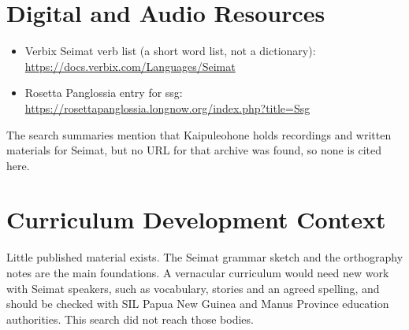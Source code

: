 \documentclass[12pt]{article}
\begin{document}
\section{Digital and Audio Resources}
\begin{itemize}
\item Verbix Seimat verb list (a short word list, not a dictionary): \url{https://docs.verbix.com/Languages/Seimat}
\item Rosetta Panglossia entry for ssg: \url{https://rosettapanglossia.longnow.org/index.php?title=Ssg}
\end{itemize}
The search summaries mention that Kaipuleohone holds recordings and written materials for Seimat, but no URL for that archive was found, so none is cited here.

\section{Curriculum Development Context}
Little published material exists. The Seimat grammar sketch and the orthography notes are the main foundations. A vernacular curriculum would need new work with Seimat speakers, such as vocabulary, stories and an agreed spelling, and should be checked with SIL Papua New Guinea and Manus Province education authorities. This search did not reach those bodies.
\end{document}

